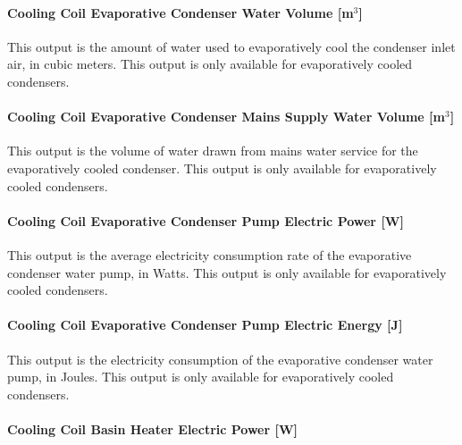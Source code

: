 \paragraph{\texorpdfstring{Cooling Coil Evaporative Condenser Water Volume {[}m\(^{3}\){]}}{Cooling Coil Evaporative Condenser Water Volume {[}m\^{}\{3\}{]}}}\label{cooling-coil-evaporative-condenser-water-volume-m3-2}

This output is the amount of water used to evaporatively cool the condenser inlet air, in cubic meters. This output is only available for evaporatively cooled condensers.

\paragraph{\texorpdfstring{Cooling Coil Evaporative Condenser Mains Supply Water Volume {[}m\(^{3}\){]}}{Cooling Coil Evaporative Condenser Mains Supply Water Volume {[}m\^{}\{3\}{]}}}\label{cooling-coil-evaporative-condenser-mains-supply-water-volume-m3-2}

This output is the volume of water drawn from mains water service for the evaporatively cooled condenser. This output is only available for evaporatively cooled condensers.

\paragraph{Cooling Coil Evaporative Condenser Pump Electric Power {[}W{]}}\label{cooling-coil-evaporative-condenser-pump-electric-power-w-1}

This output is the average electricity consumption rate of the evaporative condenser water pump, in Watts. This output is only available for evaporatively cooled condensers.

\paragraph{Cooling Coil Evaporative Condenser Pump Electric Energy {[}J{]}}\label{cooling-coil-evaporative-condenser-pump-electric-energy-j-2}

This output is the electricity consumption of the evaporative condenser water pump, in Joules. This output is only available for evaporatively cooled condensers.

\paragraph{Cooling Coil Basin Heater Electric Power {[}W{]}}\label{cooling-coil-basin-heater-electric-power-w-2}

